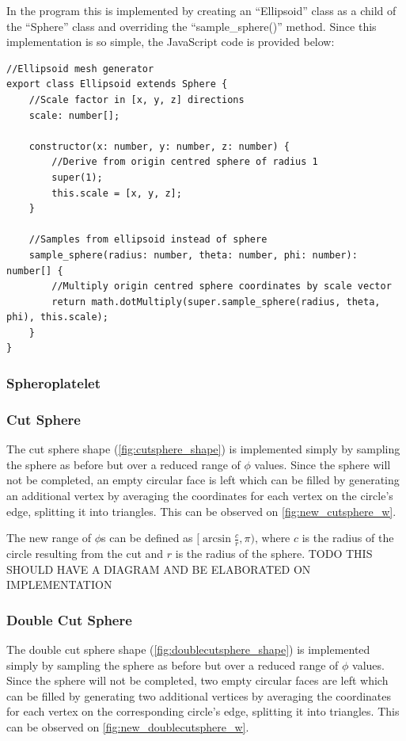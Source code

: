 In the program this is implemented by creating an ``Ellipsoid'' class as a child of the ``Sphere'' class and overriding the ``sample\_sphere()'' method. Since this implementation is so simple, the JavaScript code is provided below:

\begin{adjustbox}{width=\textwidth}
\begin{lstlisting}
//Ellipsoid mesh generator
export class Ellipsoid extends Sphere {
    //Scale factor in [x, y, z] directions
    scale: number[];

    constructor(x: number, y: number, z: number) {
        //Derive from origin centred sphere of radius 1
        super(1);
        this.scale = [x, y, z];
    }

    //Samples from ellipsoid instead of sphere
    sample_sphere(radius: number, theta: number, phi: number): number[] {
        //Multiply origin centred sphere coordinates by scale vector
        return math.dotMultiply(super.sample_sphere(radius, theta, phi), this.scale);
    }
}
\end{lstlisting}
\end{adjustbox}

\subsubsection{Spheroplatelet}

\subsubsection{Cut Sphere}
The cut sphere shape (\cref{fig:cutsphere_shape}) is implemented simply by sampling the sphere as before but over a reduced range of $\phi$ values. Since the sphere will not be completed, an empty circular face is left which can be filled by generating an additional vertex by averaging the coordinates for each vertex on the circle's edge, splitting it into triangles. This can be observed on \cref{fig:new_cutsphere_w}.

The new range of $\phi$s can be defined as $[\arcsin\frac{c}{r}, \pi)$, where $c$ is the radius of the circle resulting from the cut and $r$ is the radius of the sphere. TODO THIS SHOULD HAVE A DIAGRAM AND BE ELABORATED ON IMPLEMENTATION

\subsubsection{Double Cut Sphere}
The double cut sphere shape (\cref{fig:doublecutsphere_shape}) is implemented simply by sampling the sphere as before but over a reduced range of $\phi$ values. Since the sphere will not be completed, two empty circular faces are left which can be filled by generating two additional vertices by averaging the coordinates for each vertex on the corresponding circle's edge, splitting it into triangles. This can be observed on \cref{fig:new_doublecutsphere_w}.

